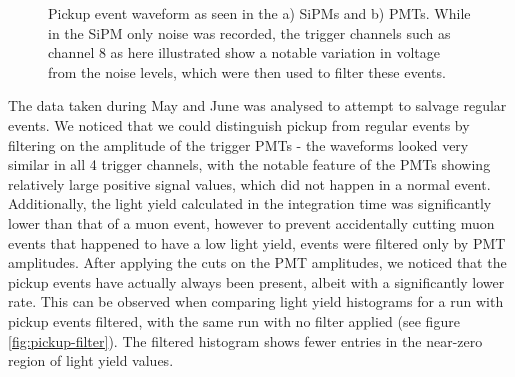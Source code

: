 \begin{figure}[h!]
\begin{subfigure}{.5\textwidth}
          \caption{}
          \label{fig:pickup-pmt}
        \end{subfigure}
        \caption{Pickup event waveform as seen in the a) \acsp{SiPM} and b) \acsp{PMT}. While in the \ac{SiPM} only noise was recorded, the trigger channels such as channel 8 as here illustrated show a notable variation in voltage from the noise levels, which were then used to filter these events.}
        \label{fig:pickup}
    \end{figure}
    
    The data taken during May and June was analysed to attempt to salvage regular events. We noticed that we could distinguish pickup from regular events by filtering on the amplitude of the trigger \acsp{PMT} - the waveforms looked very similar in all 4 trigger channels, with the notable feature of the \acsp{PMT} showing relatively large positive signal values, which did not happen in a normal event. Additionally, the light yield calculated in the integration time was significantly lower than that of a muon event, however to prevent accidentally cutting muon events that happened to have a low light yield, events were filtered only by \ac{PMT} amplitudes.
    After applying the cuts on the \ac{PMT} amplitudes, we noticed that the pickup events have actually always been present, albeit with a significantly lower rate. This can be observed when comparing light yield histograms for a run with pickup events filtered, with the same run with no filter applied (see figure \ref{fig:pickup-filter}). The filtered histogram shows fewer entries in the near-zero region of light yield values. 
    
    
